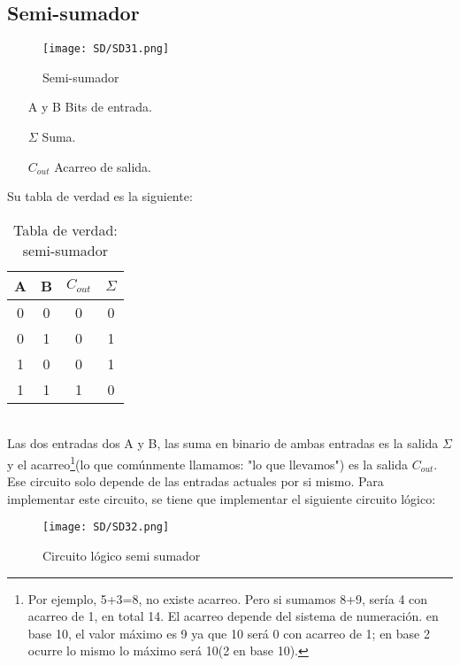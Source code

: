 \documentclass[11pt,fleqn]{book} %
\begin{document}
\subsection{Semi-sumador}
\begin{figure}[h!]
\centering
\texttt{[image: SD/SD31.png]}
\caption{Semi-sumador}
\label{fig:semisumador}
\end{figure}
\begin{itemize}
\item[A y B] Bits de entrada.
\item[$\Sigma$] Suma.
\item[$C_{out}$] Acarreo de salida.
\end{itemize}
Su tabla de verdad es la siguiente:\\
\begin{table}[h!]
\begin{center}
\begin{tabular}{|c|c|c|c|}
\hline
\rowcolor{red}
A & B & $C_{out}$ & $\Sigma$ \\ \hline
0 & 0 & 0 & 0 \\ \hline
0 & 1 & 0 & 1 \\ \hline
1 & 0 & 0 & 1 \\ \hline
1 & 1 & 1 & 0 \\ \hline
\end{tabular}
\caption{Tabla de verdad: semi-sumador}
\label{tab:semisumador}
\end{center}
\end{table}
\\Las dos entradas dos A y B, las suma en binario de ambas entradas es la salida $\Sigma$ y el acarreo\footnote{Por ejemplo, 5+3=8, no existe acarreo. Pero si sumamos 8+9, sería 4 con acarreo de 1, en total 14. El acarreo depende del sistema de numeración. en base 10, el valor máximo es 9 ya que 10 será 0 con acarreo de 1; en base 2 ocurre lo mismo lo máximo será 10(2 en base 10).}(lo que comúnmente llamamos: "lo que llevamos") es la salida $C_{out}$. Ese circuito solo depende de las entradas actuales por si mismo. Para implementar este circuito, se tiene que implementar el siguiente circuito lógico:
\begin{figure}[h!]
\centering
\texttt{[image: SD/SD32.png]}
\caption{Circuito lógico semi sumador}
\label{fig:CLsemisumador}
\end{figure}
\end{document}
